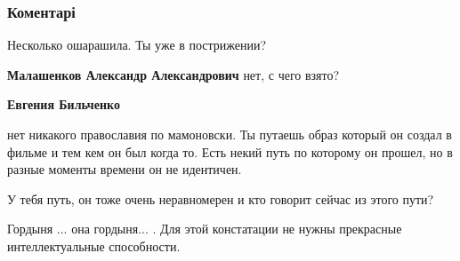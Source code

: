  
 
 
 
 
\subsubsection{Коментарі}

\begin{itemize}
 
Несколько ошарашила. Ты уже в пострижении?

\begin{itemize}
 
\textbf{Малашенков Александр Александрович} нет, с чего взято?

 
\textbf{Евгения Бильченко} 

нет никакого православия по мамоновски. Ты путаешь образ который он создал в
фильме и тем кем он был когда то. Есть некий путь по которому он прошел, но в
разные моменты времени он не идентичен.

У тебя путь, он тоже очень неравномерен и кто говорит сейчас из этого пути?

Гордыня ... она гордыня... . Для этой констатации не нужны прекрасные
интеллектуальные способности.

 

\end{itemize}
\end{itemize}
